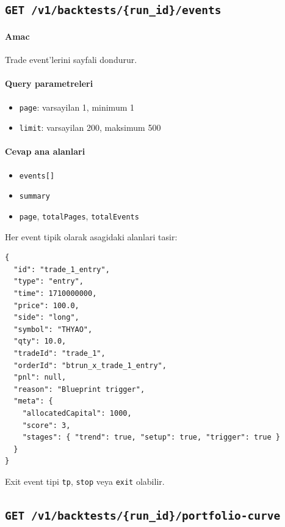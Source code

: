 \documentclass[11pt,a4paper]{article}
\begin{document}
\subsection{\texttt{GET /v1/backtests/\{run\_id\}/events}}

\paragraph{Amac}
Trade event'lerini sayfali dondurur.

\paragraph{Query parametreleri}
\begin{itemize}[leftmargin=1.5em]
    \item \texttt{page}: varsayilan 1, minimum 1
    \item \texttt{limit}: varsayilan 200, maksimum 500
\end{itemize}

\paragraph{Cevap ana alanlari}
\begin{itemize}[leftmargin=1.5em]
    \item \texttt{events[]}
    \item \texttt{summary}
    \item \texttt{page}, \texttt{totalPages}, \texttt{totalEvents}
\end{itemize}

Her event tipik olarak asagidaki alanlari tasir:

\begin{lstlisting}
{
  "id": "trade_1_entry",
  "type": "entry",
  "time": 1710000000,
  "price": 100.0,
  "side": "long",
  "symbol": "THYAO",
  "qty": 10.0,
  "tradeId": "trade_1",
  "orderId": "btrun_x_trade_1_entry",
  "pnl": null,
  "reason": "Blueprint trigger",
  "meta": {
    "allocatedCapital": 1000,
    "score": 3,
    "stages": { "trend": true, "setup": true, "trigger": true }
  }
}
\end{lstlisting}

Exit event tipi \texttt{tp}, \texttt{stop} veya \texttt{exit} olabilir.

\subsection{\texttt{GET /v1/backtests/\{run\_id\}/portfolio-curve}}
\end{document}
